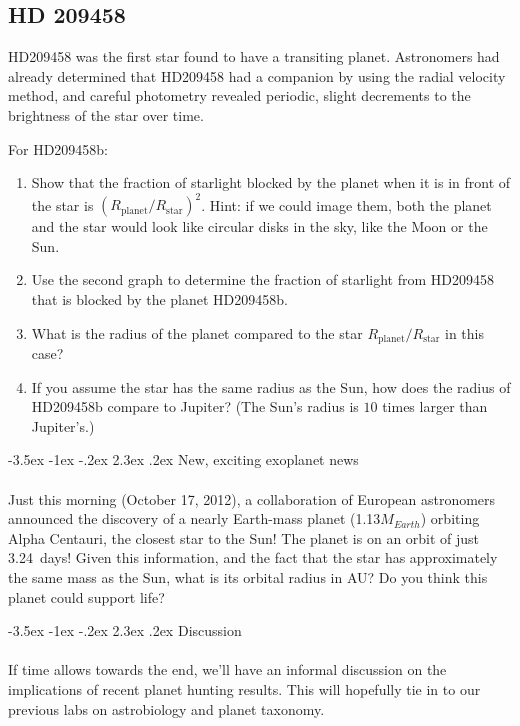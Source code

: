 \documentclass[12pt]{article}
\makeatletter
\renewcommand\section{\@startsection{section}{1}{\z@}%
                                  {-3.5ex \@plus -1ex \@minus -.2ex}%
                                  {2.3ex \@plus.2ex}%
                                  {\normalfont\large\bfseries}}
\makeatother
\begin{document}
\subsection{HD 209458}
HD209458 was the first star found to have a transiting planet. Astronomers had already determined that
HD209458 had a companion by using the radial velocity method, and careful
photometry revealed periodic, slight decrements to the brightness of the star over time. 

For HD209458b:
\begin{enumerate}
\item Show that the fraction of starlight blocked by the planet when
  it is in front of the star is
  $(R_\mathrm{planet}/R_\mathrm{star})^2$. Hint: if we could image
  them, both the planet and the star would look like circular disks in
  the sky, like the Moon or the Sun.
\item Use the second graph to determine the fraction of starlight from
  HD209458 that is blocked by the planet HD209458b.
\item What is the radius of the planet compared to the star
  $R_\mathrm{planet}/R_\mathrm{star}$ in this case?
\item If you assume the star has the same radius as the Sun, how does
 the radius of HD209458b compare to Jupiter? (The Sun's radius is
 $10$ times larger than Jupiter's.)
\end{enumerate}

\section{New, exciting exoplanet news}
\paragraph{}
Just this morning (October 17, 2012), a collaboration of European astronomers announced the discovery of a nearly Earth-mass planet (1.13$M_{Earth}$) orbiting Alpha Centauri, the closest star to the Sun! The planet is on an orbit of just 3.24~days! Given this information, and the fact that the star has approximately the same mass as the Sun, what is its orbital radius in AU? Do you think this planet could support life?

\section{Discussion}
\paragraph{}
If time allows towards the end, we'll have an informal discussion on the implications of recent
planet hunting results. This will hopefully tie in to our previous labs on astrobiology and planet taxonomy.
\end{document}
